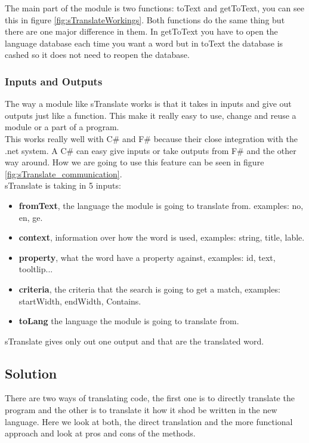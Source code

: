 \documentclass[12pt, a4paper]{article}
\begin{document}
The main part of the module is two functions: toText and getToText, you can see this in figure \ref{fig:sTranslateWorkings}. Both functions do the same thing but there are one major difference in them. In getToText you have to open the language database each time you want a word but in toText the database is cashed so it does not need to reopen the database.\\

\newpage
\subsubsection{Inputs and Outputs}
The way a module like sTranslate works is that it takes in inputs and give out outputs just like a function. This make it really easy to use, change and reuse a module or a part of a program.\\

This works really well with C\# and F\# because their close integration with the .net system. A C\# can easy give inputs or take outputs from F\# and the other way around. How we are going to use this feature can be seen in figure \ref{fig:sTranslate_communication}.\\

sTranslate is taking in 5 inputs:

\begin{itemize}
	\item \textbf{fromText}, the language the module is going to translate from. examples: no, en, ge. 
	\item \textbf{context}, information over how the word is used, examples: string, title, lable.  
	\item \textbf{property}, what the word have a property against, examples: id, text, tooltlip...  
	\item \textbf{criteria}, the criteria that the search is going to get a match, examples: startWidth, endWidth, Contains.
	\item \textbf{toLang} the language the module is going to translate from.
\end{itemize}

sTranslate gives only out one output and that are the translated word. 

\newpage

\subsection{Solution}
There are two ways of translating code, the first one is to directly translate the program and the other is to translate it how it shod be written in the new language. Here we look at both, the direct translation and the more functional approach and look at pros and cons of the methods.
\end{document}
